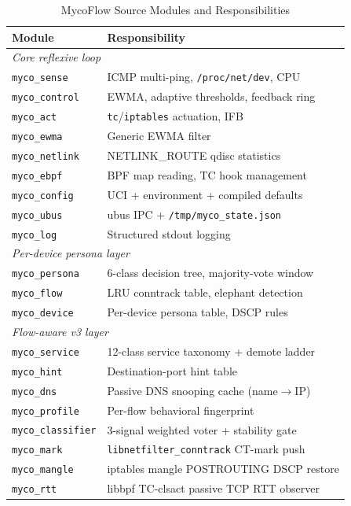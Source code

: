 \documentclass[conference]{IEEEtran}
\begin{document}
\begin{table}[t]
\caption{MycoFlow Source Modules and Responsibilities}
\label{tab:modules}
\centering
\small
{\setlength{\tabcolsep}{4pt}
\begin{tabular}{p{2.2cm}p{5.4cm}}
\toprule
\textbf{Module} & \textbf{Responsibility} \\
\midrule
\multicolumn{2}{l}{\emph{Core reflexive loop}} \\
\texttt{myco\_sense}      & ICMP multi-ping, \texttt{/proc/net/dev}, CPU \\
\texttt{myco\_control}    & EWMA, adaptive thresholds, feedback ring \\
\texttt{myco\_act}        & \texttt{tc}/\texttt{iptables} actuation, IFB \\
\texttt{myco\_ewma}       & Generic EWMA filter \\
\texttt{myco\_netlink}    & NETLINK\_ROUTE qdisc statistics \\
\texttt{myco\_ebpf}       & BPF map reading, TC hook management \\
\texttt{myco\_config}     & UCI + environment + compiled defaults \\
\texttt{myco\_ubus}       & ubus IPC + \texttt{/tmp/myco\_state.json} \\
\texttt{myco\_log}        & Structured stdout logging \\
\midrule
\multicolumn{2}{l}{\emph{Per-device persona layer}} \\
\texttt{myco\_persona}    & 6-class decision tree, majority-vote window \\
\texttt{myco\_flow}       & LRU conntrack table, elephant detection \\
\texttt{myco\_device}     & Per-device persona table, DSCP rules \\
\midrule
\multicolumn{2}{l}{\emph{Flow-aware v3 layer}} \\
\texttt{myco\_service}    & 12-class service taxonomy + demote ladder \\
\texttt{myco\_hint}       & Destination-port hint table \\
\texttt{myco\_dns}        & Passive DNS snooping cache (name$\to$IP) \\
\texttt{myco\_profile}    & Per-flow behavioral fingerprint \\
\texttt{myco\_classifier} & 3-signal weighted voter + stability gate \\
\texttt{myco\_mark}       & \texttt{libnetfilter\_conntrack} CT-mark push \\
\texttt{myco\_mangle}     & iptables mangle POSTROUTING DSCP restore \\
\texttt{myco\_rtt}        & libbpf TC-clsact passive TCP RTT observer \\
\bottomrule
\end{tabular}}
\end{table}
\end{document}
